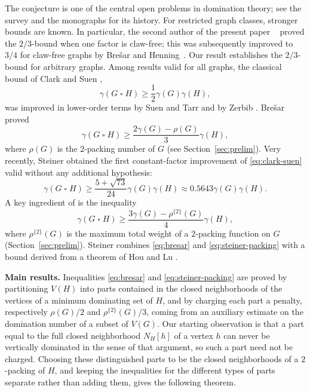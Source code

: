 \documentclass[10pt]{amsart}
\theoremstyle{remark}
\newcommand{\N}{N}
\newcommand{\V}{V}
\newcommand{\rhoTwo}{\rho^{\{2\}}}
\begin{document}
The conjecture is one of the central open problems in domination theory; see
the survey \cite{BresarEtAl2012} and the monographs \cite{Haynes2023,Haynes1998}
for its history. For restricted graph classes, stronger bounds are known. In particular,
the second author of the present paper ~\cite{Krop2017} proved the $2/3$-bound when one factor is claw-free;
this was subsequently improved to $3/4$ for claw-free graphs by
Bre\v{s}ar and Henning~\cite{BresarHenning2020}. Our result establishes
the $2/3$-bound for arbitrary graphs.
Among results valid for all graphs, the classical bound of
Clark and Suen \cite{ClarkSuen2000},
\begin{equation}
 \gamma(G\mathbin{\square}H)\geq \frac12\gamma(G)\gamma(H),
 \label{eq:clark-suen}
\end{equation}
was improved in lower-order terms by Suen and Tarr \cite{SuenTarr2012} and by
Zerbib \cite{Zerbib2019}. Bre\v{s}ar \cite{Bresar2017} proved
\begin{equation}
 \gamma(G\mathbin{\square}H)
 \geq \frac{2\gamma(G)-\rho(G)}{3}\gamma(H),
 \label{eq:bresar}
\end{equation}
where $\rho(G)$ is the $2$-packing number of $G$ (see Section~\ref{sec:prelim}).
Very recently, Steiner \cite{Steiner2026} obtained the first constant-factor
improvement of \eqref{eq:clark-suen} valid without any additional hypothesis:
\begin{equation}
 \gamma(G\mathbin{\square}H)
 \geq \frac{5+\sqrt{73}}{24}\gamma(G)\gamma(H)
 \approx 0.5643\gamma(G)\gamma(H).
 \label{eq:steiner-main}
\end{equation}
A key ingredient of \cite{Steiner2026} is the inequality
\begin{equation}
 \gamma(G\mathbin{\square}H)
 \geq \frac{3\gamma(G)-\rhoTwo(G)}{4}\gamma(H),
 \label{eq:steiner-packing}
\end{equation}
where $\rhoTwo(G)$ is the maximum total weight of a $2$-packing function on
$G$ (Section~\ref{sec:prelim}). Steiner combines \eqref{eq:bresar} and
\eqref{eq:steiner-packing} with a bound derived from a theorem of Hou and Lu
\cite{HouLu2009}.

\medskip
\noindent\textbf{Main results.}
Inequalities \eqref{eq:bresar} and \eqref{eq:steiner-packing} are proved by
partitioning $\V(H)$ into parts contained in the closed neighborhoods of the
vertices of a minimum dominating set of $H$, and by charging each part a
penalty, respectively $\rho(G)/2$ and $\rhoTwo(G)/3$, coming from an auxiliary
estimate on the domination number of a subset of $\V(G)$. Our starting
observation is that a part equal to the full closed neighborhood $\N_H[h]$ of
a vertex $h$ can never be vertically dominated in the sense of that argument,
so such a part need not be charged. Choosing these distinguished parts to be
the closed neighborhoods of a $2$-packing of $H$, and keeping the inequalities
for the different types of parts separate rather than adding them, gives the
following theorem.
\end{document}
